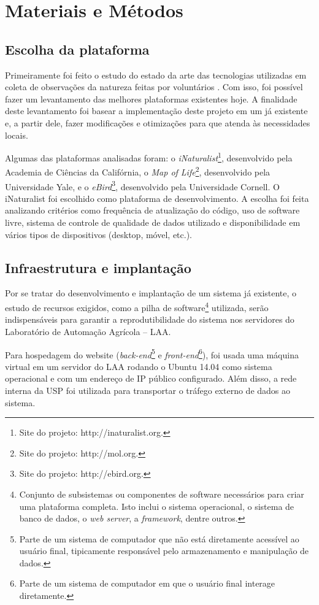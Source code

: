 \section{Materiais e Métodos}
\subsection{Escolha da plataforma}
Primeiramente foi feito o estudo do estado da arte das tecnologias utilizadas em coleta de observações da natureza feitas por voluntários \cite{azavea2014, azavea2015}. Com isso, foi possível fazer um levantamento das melhores plataformas existentes hoje. A finalidade deste levantamento foi basear a implementação deste projeto em um já existente e, a partir dele, fazer modificações e otimizações para que atenda às necessidades locais.

Algumas das plataformas analisadas foram: o \emph{iNaturalist}\footnote{Site do projeto: http://inaturalist.org.}, desenvolvido pela Academia de Ciências da Califórnia, o \emph{Map of Life}\footnote{Site do projeto: http://mol.org.}, desenvolvido pela Universidade Yale, e o \emph{eBird}\footnote{Site do projeto: http://ebird.org.}, desenvolvido pela Universidade Cornell. O iNaturalist foi escolhido como plataforma de desenvolvimento. A escolha foi feita analizando critérios como frequência de atualização do código, uso de software livre, sistema de controle de qualidade de dados utilizado e disponibilidade em vários tipos de dispositivos (desktop, móvel, etc.).

\subsection{Infraestrutura e implantação}
Por se tratar do desenvolvimento e implantação de um sistema já existente, o estudo de recursos exigidos, como a pilha de software\footnote{Conjunto de subsistemas ou componentes de software necessários para criar uma plataforma completa. Isto inclui o sistema operacional, o sistema de banco de dados, o \emph{web server}, a \emph{framework}, dentre outros.} utilizada, serão indispensáveis para garantir a reprodutibilidade do sistema nos servidores do Laboratório de Automação Agrícola -- LAA.

Para hospedagem do website (\emph{back-end}\footnote{Parte de um sistema de computador que não está diretamente acessível ao usuário final, tipicamente responsável pelo armazenamento e manipulação de dados.} e \emph{front-end}\footnote{Parte de um sistema de computador em que o usuário final interage diretamente.}), foi usada uma máquina virtual em um servidor do LAA rodando o Ubuntu 14.04 como sistema operacional e com um endereço de IP público configurado. Além disso, a rede interna da USP foi utilizada para transportar o tráfego externo de dados ao sistema.

